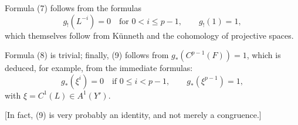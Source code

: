 Formula (7) follows from the formulas
\begin{equation}\tag{10}
  g_!(L^{-i})=0\quad\text{for }0<i\leq p-1,\qquad g_!(1)=1,
\end{equation}
which themselves follow from K\"unneth and the cohomology of projective spaces.

Formula (8) is trivial; finally, (9) follows from \(g_*(C^{p-1}(F))=1\), which is deduced, for example, from the immediate formulas:
\begin{equation}\tag{10 bis}
  g_*(\xi^i)=0\quad\text{if }0\leq i<p-1,\qquad
  g_*(\xi^{p-1})=1,
\end{equation}
with \(\xi=C^1(L)\in A^1(Y')\).

[In fact, (9) is very probably an identity, and not merely a congruence.]



